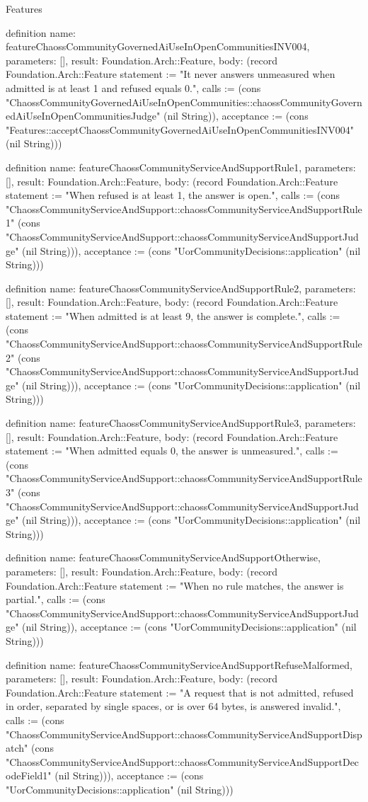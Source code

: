 \begin{lexlean}{Features}
\begin{semanticmodule}
definition{
  name: featureChaossCommunityGovernedAiUseInOpenCommunitiesINV004,
  parameters: [],
  result: Foundation.Arch::Feature,
  body: (record Foundation.Arch::Feature {statement := "It never answers unmeasured when admitted is at least 1 and refused equals 0.", calls := (cons "ChaossCommunityGovernedAiUseInOpenCommunities::chaossCommunityGovernedAiUseInOpenCommunitiesJudge" (nil String)), acceptance := (cons "Features::acceptChaossCommunityGovernedAiUseInOpenCommunitiesINV004" (nil String))})
}

definition{
  name: featureChaossCommunityServiceAndSupportRule1,
  parameters: [],
  result: Foundation.Arch::Feature,
  body: (record Foundation.Arch::Feature {statement := "When refused is at least 1, the answer is open.", calls := (cons "ChaossCommunityServiceAndSupport::chaossCommunityServiceAndSupportRule1" (cons "ChaossCommunityServiceAndSupport::chaossCommunityServiceAndSupportJudge" (nil String))), acceptance := (cons "UorCommunityDecisions::application" (nil String))})
}

definition{
  name: featureChaossCommunityServiceAndSupportRule2,
  parameters: [],
  result: Foundation.Arch::Feature,
  body: (record Foundation.Arch::Feature {statement := "When admitted is at least 9, the answer is complete.", calls := (cons "ChaossCommunityServiceAndSupport::chaossCommunityServiceAndSupportRule2" (cons "ChaossCommunityServiceAndSupport::chaossCommunityServiceAndSupportJudge" (nil String))), acceptance := (cons "UorCommunityDecisions::application" (nil String))})
}

definition{
  name: featureChaossCommunityServiceAndSupportRule3,
  parameters: [],
  result: Foundation.Arch::Feature,
  body: (record Foundation.Arch::Feature {statement := "When admitted equals 0, the answer is unmeasured.", calls := (cons "ChaossCommunityServiceAndSupport::chaossCommunityServiceAndSupportRule3" (cons "ChaossCommunityServiceAndSupport::chaossCommunityServiceAndSupportJudge" (nil String))), acceptance := (cons "UorCommunityDecisions::application" (nil String))})
}

definition{
  name: featureChaossCommunityServiceAndSupportOtherwise,
  parameters: [],
  result: Foundation.Arch::Feature,
  body: (record Foundation.Arch::Feature {statement := "When no rule matches, the answer is partial.", calls := (cons "ChaossCommunityServiceAndSupport::chaossCommunityServiceAndSupportJudge" (nil String)), acceptance := (cons "UorCommunityDecisions::application" (nil String))})
}

definition{
  name: featureChaossCommunityServiceAndSupportRefuseMalformed,
  parameters: [],
  result: Foundation.Arch::Feature,
  body: (record Foundation.Arch::Feature {statement := "A request that is not admitted, refused in order, separated by single spaces, or is over 64 bytes, is answered invalid.", calls := (cons "ChaossCommunityServiceAndSupport::chaossCommunityServiceAndSupportDispatch" (cons "ChaossCommunityServiceAndSupport::chaossCommunityServiceAndSupportDecodeField1" (nil String))), acceptance := (cons "UorCommunityDecisions::application" (nil String))})
}


\end{semanticmodule}
\end{lexlean}
